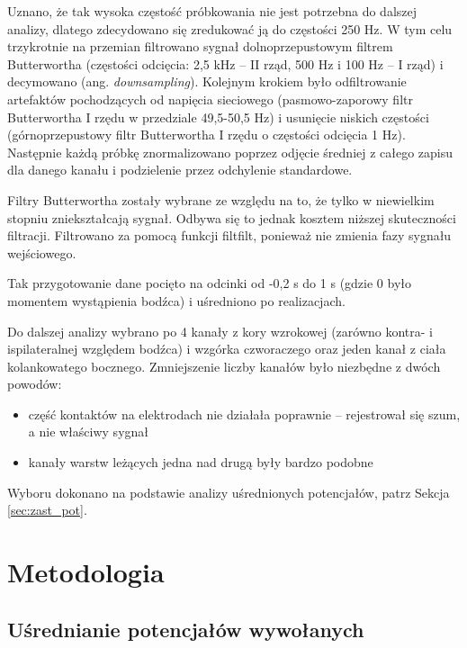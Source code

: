 \documentclass{pracamgr_2}
\begin{document}
Uznano, że tak wysoka częstość próbkowania nie jest potrzebna do dalszej analizy, dlatego zdecydowano się zredukować ją do częstości 250 Hz. W tym celu trzykrotnie na przemian filtrowano sygnał dolnoprzepustowym filtrem Butterwortha (częstości odcięcia: 2,5 kHz -- II rząd, 500 Hz i  100 Hz -- I rząd) i decymowano (ang. \textit{downsampling}). Kolejnym krokiem było odfiltrowanie artefaktów pochodzących od napięcia sieciowego (pasmowo-zaporowy filtr Butterwortha I rzędu w przedziale 49,5-50,5 Hz) i usunięcie niskich częstości (górnoprzepustowy filtr Butterwortha I rzędu o częstości odcięcia 1 Hz). Następnie każdą próbkę znormalizowano poprzez odjęcie średniej z całego zapisu dla danego kanału i podzielenie przez odchylenie standardowe.

Filtry Butterwortha zostały wybrane ze względu na to, że tylko w niewielkim stopniu zniekształcają sygnał. Odbywa się to jednak kosztem niższej skuteczności filtracji. Filtrowano za pomocą funkcji filtfilt, ponieważ nie zmienia fazy sygnału wejściowego.

Tak przygotowanie dane pocięto na odcinki od -0,2 s do 1 s (gdzie 0 było momentem wystąpienia bodźca) i uśredniono po realizacjach.

Do dalszej analizy wybrano po 4 kanały z kory wzrokowej (zarówno kontra- i ispilateralnej względem bodźca) i wzgórka czworaczego oraz jeden kanał z ciała kolankowatego bocznego. Zmniejszenie liczby kanałów było niezbędne z dwóch powodów:
\begin{itemize}
	\item część kontaktów na elektrodach nie działała poprawnie -- rejestrował się szum, a nie właściwy sygnał
	\item kanały warstw leżących jedna nad drugą były bardzo podobne
\end{itemize}
Wyboru dokonano na podstawie analizy uśrednionych potencjałów, patrz Sekcja \ref{sec:zast_pot}.
\chapter{Metodologia}
\section{Uśrednianie potencjałów wywołanych}
\end{document}
